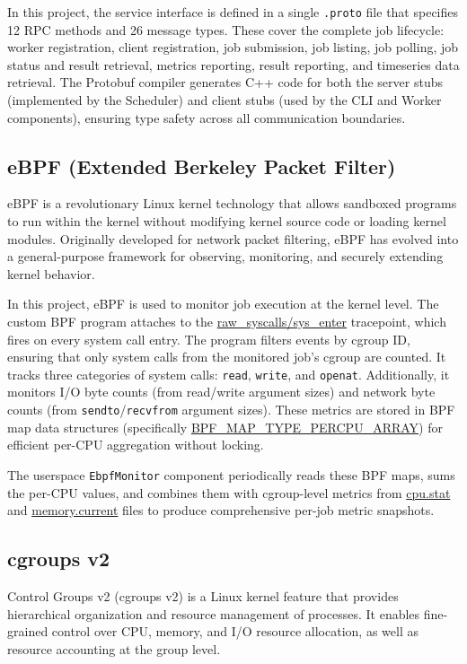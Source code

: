 In this project, the service interface is defined in a single \texttt{.proto} file that specifies 12 RPC methods and 26 message types. These cover the complete job lifecycle: worker registration, client registration, job submission, job listing, job polling, job status and result retrieval, metrics reporting, result reporting, and timeseries data retrieval. The Protobuf compiler generates C++ code for both the server stubs (implemented by the Scheduler) and client stubs (used by the CLI and Worker components), ensuring type safety across all communication boundaries.

\subsection{eBPF (Extended Berkeley Packet Filter)}

eBPF \cite{vieira2020ebpf} is a revolutionary Linux kernel technology that allows sandboxed programs to run within the kernel without modifying kernel source code or loading kernel modules. Originally developed for network packet filtering, eBPF has evolved into a general-purpose framework for observing, monitoring, and securely extending kernel behavior.

In this project, eBPF is used to monitor job execution at the kernel level. The custom BPF program attaches to the \url{raw_syscalls/sys_enter} tracepoint, which fires on every system call entry. The program filters events by cgroup ID, ensuring that only system calls from the monitored job's cgroup are counted. It tracks three categories of system calls: \texttt{read}, \texttt{write}, and \texttt{openat}. Additionally, it monitors I/O byte counts (from read/write argument sizes) and network byte counts (from \texttt{sendto}/\texttt{recvfrom} argument sizes). These metrics are stored in BPF map data structures (specifically \url{BPF_MAP_TYPE_PERCPU_ARRAY}) for efficient per-CPU aggregation without locking.

The userspace \texttt{EbpfMonitor} component periodically reads these BPF maps, sums the per-CPU values, and combines them with cgroup-level metrics from \url{cpu.stat} and \url{memory.current} files to produce comprehensive per-job metric snapshots.

\subsection{cgroups v2}

Control Groups v2 (cgroups v2) \cite{cgroupv2kernel} is a Linux kernel feature that provides hierarchical organization and resource management of processes. It enables fine-grained control over CPU, memory, and I/O resource allocation, as well as resource accounting at the group level.

